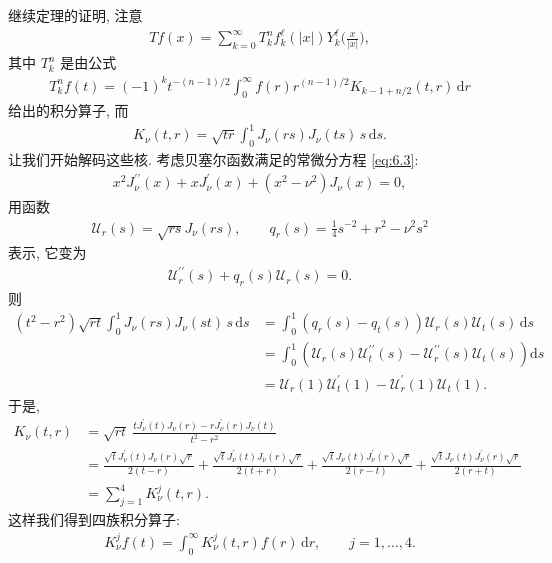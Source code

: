 继续定理的证明, 注意
\begin{align*}
  T f(x)=\sum_{k=0}^{\infty}T_{k}^{n}f_{k}^{\ell}(|x|)Y_{k}^{\ell}\Big(\frac{x}{|x|}\Big),
\end{align*}
其中 $T_{k}^{n}$ 是由公式
\begin{align*}
  T_{k}^{n}f(t)=\left(-1\right)^{k}t^{-\left(n-1\right)/2}\int_{0}^{\infty}f(r)r^{\left(n-1\right)/2}K_{k-1+n/2}(t,r)\,\mathrm{d}r
\end{align*}
给出的积分算子, 而
\begin{align*}
  K_{\nu}(t,r)=\sqrt{t r}\int_{0}^{1}J_{\nu}(r s)J_{\nu}(t s)\,s\,\mathrm{d}s.
\end{align*}
让我们开始解码这些核. 考虑贝塞尔函数满足的常微分方程 \eqref{eq:6.3}:
\begin{align*}
  x^{2}J_{\nu}^{\prime\prime}(x)+x J_{\nu}^{\prime}(x)+\left(x^{2}-\nu^{2}\right)J_{\nu}(x)=0,
\end{align*}
用函数
\begin{align*}
  \mathcal{U}_{r}(s)=\sqrt{r s}J_{\nu}(r s),\qquad
  q_{r}(s)=\frac{1}{4}s^{-2}+r^{2}-\nu^{2}s^{2}
\end{align*}
表示, 它变为
\begin{align*}
  \mathcal{U}_{r}^{\prime\prime}(s)+q_{r}(s)\mathcal{U}_{r}(s)=0.
\end{align*}
则
\begin{align*}
  (t^{2}-r^{2})\sqrt{rt}\int_{0}^{1}J_{\nu}(rs)J_{\nu}(st)\,s\,\mathrm{d}s
  &=\int_{0}^{1}(q_{r}(s)-q_{t}(s))\mathcal{U}_{r}(s)\mathcal{U}_{t}(s)\,\mathrm{d}s\\
  &=\int_{0}^{1}\left(\mathcal{U}_{r}(s)\mathcal{U}_{t}^{\prime\prime}(s)-\mathcal{U}_{r}^{\prime\prime}(s)\mathcal{U}_{t}(s)\right)\mathrm{d}s\\
  &=\mathcal{U}_{r}(1)\mathcal{U}_{t}^{\prime}(1)-\mathcal{U}_{r}^{\prime}(1)\mathcal{U}_{t}(1).
\end{align*}
于是,
\begin{align*}
  K_{\nu}(t,r)
  &=\sqrt{rt}\ \frac{t J_{\nu}^{\prime}(t)J_{\nu}(r)-r J_{\nu}^{\prime}(r)J_{\nu}(t)}{t^{2}-r^{2}}\\
  &=\frac{\sqrt{t}J_{\nu}^{\prime}(t)J_{\nu}(r)\sqrt{r}}{2(t-r)}
   +\frac{\sqrt{t}J_{\nu}^{\prime}(t)J_{\nu}(r)\sqrt{r}}{2(t+r)}
   +\frac{\sqrt{t}J_{\nu}(t)J_{\nu}^{\prime}(r)\sqrt{r}}{2(r-t)}
   +\frac{\sqrt{t}J_{\nu}(t)J_{\nu}^{\prime}(r)\sqrt{r}}{2(r+t)}\\
  &=\sum_{j=1}^{4}K_{\nu}^{j}(t,r).
\end{align*}
这样我们得到四族积分算子:
\begin{align*}
  K_{\nu}^{j}f(t)=\int_{0}^{\infty}K_{\nu}^{j}(t,r)f(r)\,\mathrm{d}r,\qquad j=1,\ldots,4.
\end{align*}
